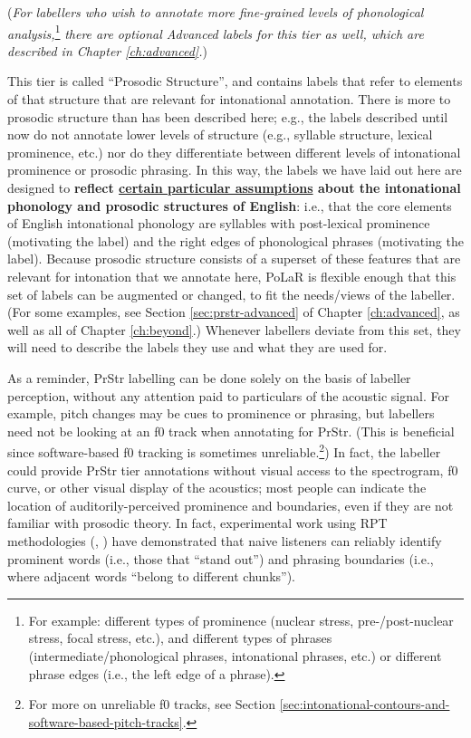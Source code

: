 \documentclass[11pt, twoside]{memoir}
\def\textlabel#1{{\relsize{-.5}\fontspec[Mapping=tex-text]{Roboto Mono}{#1}}}
\begin{document}
(\textit{For labellers who wish to annotate more fine-grained levels of phonological analysis,}\footnote{For example: different types of prominence (nuclear stress, pre-\slash post-nuclear stress, focal stress, etc.), and different types of phrases (intermediate\slash phonological phrases, intonational phrases, etc.) or different phrase edges (i.e., the left edge of a phrase).} \textit{there are optional Advanced labels for this tier as well, which are described in Chapter \ref{ch:advanced}.})

\begin{infobox}[frametitle=\textbf{A side-note about this tier}]
This tier is called “Prosodic Structure”, and contains labels that refer to elements of that structure that are relevant for intonational annotation. There is more to prosodic structure than has been described here; e.g., the labels described until now do not annotate lower levels of structure (e.g., syllable structure, lexical prominence, etc.) nor do they differentiate between different levels of intonational prominence or prosodic phrasing. In this way, the labels we have laid out here are designed to \textbf{reflect \uline{certain particular assumptions} about the intonational phonology and prosodic structures of English}: i.e., that the core elements of English intonational phonology are syllables with post-lexical prominence (motivating the \textlabel{*} label) and the right edges of phonological phrases (motivating the \textlabel{]} label). Because prosodic structure consists of a superset of these features that are relevant for intonation that we annotate here, PoLaR is flexible enough that this set of labels can be augmented or changed, to fit the needs\slash views of the labeller. (For some examples, see Section \ref{sec:prstr-advanced} of Chapter \ref{ch:advanced}, as well as all of Chapter \ref{ch:beyond}.) Whenever labellers deviate from this set, they will need to describe the labels they use and what they are used for.
\end{infobox}

As a reminder, PrStr labelling can be done solely on the basis of labeller perception, without any attention paid to particulars of the acoustic signal. For example, pitch changes may be cues to prominence or phrasing, but labellers need not be looking at an f0 track when annotating for PrStr. (This is beneficial since software-based f0 tracking is sometimes unreliable.\footnote{For more on unreliable f0 tracks, see Section \ref{sec:intonational-contours-and-software-based-pitch-tracks}.}) In fact, the labeller could provide PrStr tier annotations without visual access to the spectrogram, f0 curve, or other visual display of the acoustics; most people can indicate the location of auditorily-perceived prominence and boundaries, even if they are not familiar with prosodic theory. In fact, experimental work using RPT methodologies (\citealt{cole-14, cole-17}, \citealt{cole-16}) have demonstrated that naive listeners can reliably identify prominent words (i.e., those that “stand out”) and phrasing boundaries (i.e., where adjacent words “belong to different chunks”).
\end{document}
